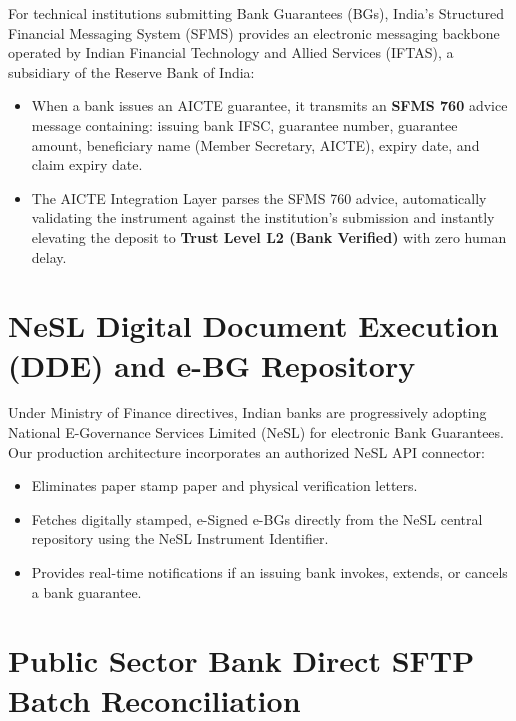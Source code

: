 \documentclass[12pt, a4paper]{report}
\begin{document}
For technical institutions submitting Bank Guarantees (BGs), India's Structured Financial Messaging System (SFMS) provides an electronic messaging backbone operated by Indian Financial Technology and Allied Services (IFTAS), a subsidiary of the Reserve Bank of India:
\begin{itemize}[leftmargin=2em]
  \item When a bank issues an AICTE guarantee, it transmits an \textbf{SFMS 760} advice message containing: issuing bank IFSC, guarantee number, guarantee amount, beneficiary name (Member Secretary, AICTE), expiry date, and claim expiry date.
  \item The AICTE Integration Layer parses the SFMS 760 advice, automatically validating the instrument against the institution's submission and instantly elevating the deposit to \textbf{Trust Level L2 (Bank Verified)} with zero human delay.
\end{itemize}

\section{NeSL Digital Document Execution (DDE) and e-BG Repository}

Under Ministry of Finance directives, Indian banks are progressively adopting National E-Governance Services Limited (NeSL) for electronic Bank Guarantees. Our production architecture incorporates an authorized NeSL API connector:
\begin{itemize}[leftmargin=2em]
  \item Eliminates paper stamp paper and physical verification letters.
  \item Fetches digitally stamped, e-Signed e-BGs directly from the NeSL central repository using the NeSL Instrument Identifier.
  \item Provides real-time notifications if an issuing bank invokes, extends, or cancels a bank guarantee.
\end{itemize}

\section{Public Sector Bank Direct SFTP Batch Reconciliation}
\end{document}
